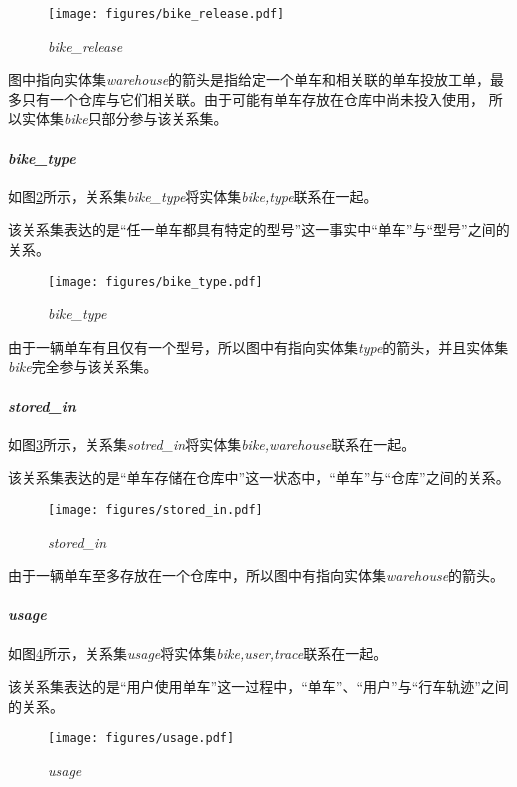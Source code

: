 \begin{figure}[htbp]
  \centering
  \texttt{[image: figures/bike\_release.pdf]}
  \caption{\textit{bike\_release}}
  \label{fig:bikerelease}
\end{figure}

图中指向实体集\textit{warehouse}的箭头是指给定一个单车和相关联的单车投放工单，最多只有一个仓库与它们相关联。由于可能有单车存放在仓库中尚未投入使用，
所以实体集\textit{bike}只部分参与该关系集。
\paragraph{\textit{bike\_type}}
如图\ref{fig:biketype}所示，关系集\textit{bike\_type}将实体集\textit{bike,type}联系在一起。

该关系集表达的是“任一单车都具有特定的型号”这一事实中“单车”与“型号”之间的关系。

\begin{figure}[htbp]
  \centering
  \texttt{[image: figures/bike\_type.pdf]}
  \caption{\textit{bike\_type}}
  \label{fig:biketype}
\end{figure}

由于一辆单车有且仅有一个型号，所以图中有指向实体集\textit{type}的箭头，并且实体集\textit{bike}完全参与该关系集。
\paragraph{\textit{stored\_in}}
如图\ref{fig:storedin}所示，关系集\textit{sotred\_in}将实体集\textit{bike,warehouse}联系在一起。

该关系集表达的是“单车存储在仓库中”这一状态中，“单车”与“仓库”之间的关系。

\begin{figure}[htbp]
  \centering
  \texttt{[image: figures/stored\_in.pdf]}
  \caption{\textit{stored\_in}}
  \label{fig:storedin}
\end{figure}

由于一辆单车至多存放在一个仓库中，所以图中有指向实体集\textit{warehouse}的箭头。
\paragraph{\textit{usage}}
如图\ref{fig:usage}所示，关系集\textit{usage}将实体集\textit{bike,user,trace}联系在一起。

该关系集表达的是“用户使用单车”这一过程中，“单车”、“用户”与“行车轨迹”之间的关系。

\begin{figure}[htbp]
  \centering
  \texttt{[image: figures/usage.pdf]}
  \caption{\textit{usage}}
  \label{fig:usage}
\end{figure}

